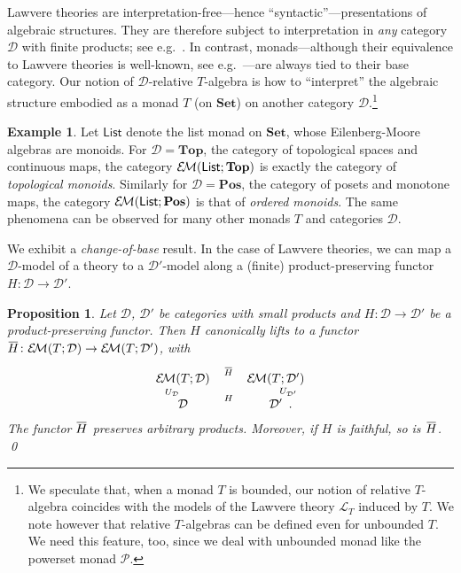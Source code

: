 \documentclass[9pt, preprint]{sigplanconf}
\theoremstyle{theorem}
\newtheorem{proposition}[theorem]{Proposition}
\theoremstyle{definition}
\newtheorem{example}[theorem]{Example}
\newcommand{\cat}[1]{\mathcal{#1}}
\renewcommand{\bar}{\overbar}
\newcommand{\overbar}[1]{\mkern 1.5mu\overline{\mkern-1.5mu#1\mkern-1.5mu}\mkern 1.5mu}
\newcommand{\pow}{\mathcal{P}}
\newcommand{\Set}{\mathbf{Set}}
\newcommand{\Sets}{\Set}
\newcommand{\Pos}{\mathbf{Pos}}
\newcommand{\Top}{\mathbf{Top}}
\newcommand{\EM}{\mathcal{E}{\kern-.5ex}\mathcal{M}}
\newcommand{\List}{\mathsf{List}}
\begin{document}
 Lawvere theories are interpretation-free---hence
 ``syntactic''---presentations of algebraic structures. They are
 therefore subject to interpretation in \emph{any} category $\cat{D}$
 with finite products; see e.g.~\cite{hyland2007category}. In
 contrast, monads---although their equivalence to Lawvere theories is
 well-known, see e.g.~\cite{LackP09}---are always tied to their base
 category. Our notion of $\cat{D}$-relative $T$-algebra is how to
 ``interpret'' the algebraic structure embodied as a monad $T$ (on
 $\Sets$) on another category $\cat{D}$.\footnote{We speculate that,
   when a monad $T$ is bounded, our notion of relative $T$-algebra
   coincides with the models of the Lawvere theory $\cat{L}_{T}$
   induced by $T$. We note however that relative $T$-algebras can be
   defined even for unbounded $T$. We need this feature, too, since we
   deal with unbounded monad like the powerset monad $\pow$. }


\begin{example}
  \label{ex:example-of-relative-emcat}
  Let $\List$ denote the list monad on $\Sets$,
 whose Eilenberg-Moore algebras are monoids.
  For $\cat{D} = \Top$, the category of topological spaces and continuous
 maps,  the  category $\EM(\List; \Top)$
  is exactly the category of \emph{topological monoids}.
  Similarly for $\cat{D} = \Pos$, the category of posets and monotone maps, the  category
  $\EM(\List; \Pos)$ is that of \emph{ordered monoids}.
  The same phenomena can be observed for many other monads $T$ and
 categories $\cat{D}$.
\end{example}

We exhibit a  \emph{change-of-base} result.
In the case of Lawvere theories,
we can map a $\cat{D}$-model of a theory to a $\cat{D'}$-model
along a (finite) product-preserving functor
$H \colon \cat{D} \to \cat{D'}$.


\begin{proposition}
  \label{prop:change-of-base}
  Let $\cat{D}$, $\cat{D'}$ be categories with small products and
  $H \colon \cat{D} \to \cat{D'}$ be a product-preserving functor.
  Then $H$ canonically lifts to a functor
  $\bar{H} \colon \EM(T; \cat{D}) \to \EM(T; \cat{D'})$,
with
  \begin{equation}\label{eq:change-of-base-lifting}
\vcenter{    \xymatrix@R-1.8em{
      \EM(T;\cat{D}) \ar[r]^-{\bar{H}} \ar[d]_-{U_{\cat{D}}}
      & \EM(T;\cat{D'}) \ar[d]^-{U_{\cat{D'}}} \\
      \cat{D} \ar[r]^-{H}
      & \cat{D'} \mathrlap{\enspace.}
    }
}  \end{equation}
  The functor $\bar{H}$ preserves arbitrary products. Moreover,
  if $H$ is faithful, so is $\bar{H}$.
 \qed
\end{proposition}
\end{document}
